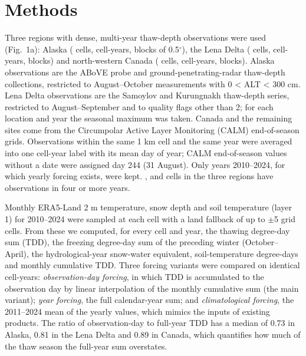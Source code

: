 \section{Methods}\label{sec:methods}

Three regions with dense, multi-year thaw-depth observations were used (Fig.~1a): Alaska (\nncellAk{} cells, \nncyAk{} cell-years, \nnblkAk{} blocks of 0.5$^\circ$), the Lena Delta (\nncellLe{} cells, \nncyLe{} cell-years, \nnblkLe{} blocks) and north-western Canada (\nncellCa{} cells, \nncyCa{} cell-years, \nnblkCa{} blocks). Alaska observations are the ABoVE probe and ground-penetrating-radar thaw-depth collections\cite{Streletskiy2025,Talucci2024,Whitcomb2024}, restricted to August--October measurements with 0 < ALT < 300 cm. Lena Delta observations are the Samoylov and Kurungnakh thaw-depth series\cite{Boike2024}, restricted to August--September and to quality flags other than 2; for each location and year the seasonal maximum was taken. Canada and the remaining sites come from the Circumpolar Active Layer Monitoring (CALM) end-of-season grids\cite{Streletskiy2025}. Observations within the same 1 km cell and the same year were averaged into one cell-year label with its mean day of year; CALM end-of-season values without a date were assigned day 244 (31 August). Only years 2010--2024, for which yearly forcing exists, were kept. \nnmultiAk{}, \nnmultiLe{} and \nnmultiCa{} cells in the three regions have observations in four or more years.

Monthly ERA5-Land 2 m temperature, snow depth and soil temperature (layer 1) for 2010--2024\cite{munozsabater2021_era5_land} were sampled at each cell with a land fallback of up to $\pm$5 grid cells. From these we computed, for every cell and year, the thawing degree-day sum (TDD), the freezing degree-day sum of the preceding winter (October--April), the hydrological-year snow-water equivalent, soil-temperature degree-days and monthly cumulative TDD. Three forcing variants were compared on identical cell-years: \emph{observation-day forcing}, in which TDD is accumulated to the observation day by linear interpolation of the monthly cumulative sum (the main variant); \emph{year forcing}, the full calendar-year sum; and \emph{climatological forcing}, the 2011--2024 mean of the yearly values, which mimics the inputs of existing products. The ratio of observation-day to full-year TDD has a median of 0.73 in Alaska, 0.81 in the Lena Delta and 0.89 in Canada, which quantifies how much of the thaw season the full-year sum overstates.

